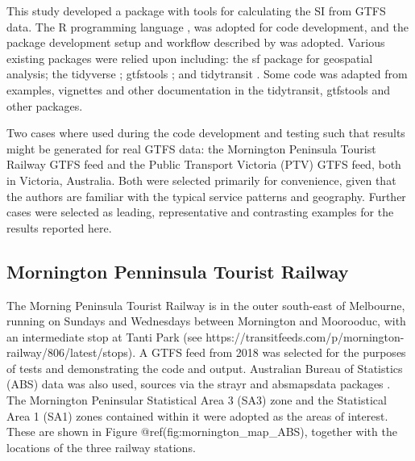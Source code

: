 \documentclass[preprint, 3p,
authoryear]{elsarticle} %
\begin{document}
This study developed a package with tools for calculating the SI from
GTFS data. The R programming language \citep{R-base}, was adopted for
code development, and the package development setup and workflow
described by \citet{wickham2023r} was adopted. Various existing packages
were relied upon including: the sf package \citep{R-sf} for geospatial
analysis; the tidyverse \citep{tidyverse2019}; gtfstools
\citep{R-gtfstools}; and tidytransit \citep{R-tidytransit}. Some code
was adapted from examples, vignettes and other documentation in the
tidytransit, gtfstools and other packages.

Two cases where used during the code development and testing such that
results might be generated for real GTFS data: the Mornington Peninsula
Tourist Railway GTFS feed and the Public Transport Victoria (PTV) GTFS
feed, both in Victoria, Australia. Both were selected primarily for
convenience, given that the authors are familiar with the typical
service patterns and geography. Further cases were selected as leading,
representative and contrasting examples for the results reported here.

\hypertarget{mornington-penninsula-tourist-railway}{%
\subsection{Mornington Penninsula Tourist
Railway}\label{mornington-penninsula-tourist-railway}}

The Morning Peninsula Tourist Railway is in the outer south-east of
Melbourne, running on Sundays and Wednesdays between Mornington and
Moorooduc, with an intermediate stop at Tanti Park (see
https://transitfeeds.com/p/mornington-railway/806/latest/stops). A GTFS
feed from 2018 was selected for the purposes of tests and demonstrating
the code and output. Australian Bureau of Statistics (ABS) data was also
used, sources via the strayr and absmapsdata packages \citep{r-strayr}.
The Mornington Peninsular Statistical Area 3 (SA3) zone and the
Statistical Area 1 (SA1) zones contained within it were adopted as the
areas of interest. These are shown in Figure
@ref(fig:mornington\_map\_ABS), together with the locations of the three
railway stations.
\end{document}

